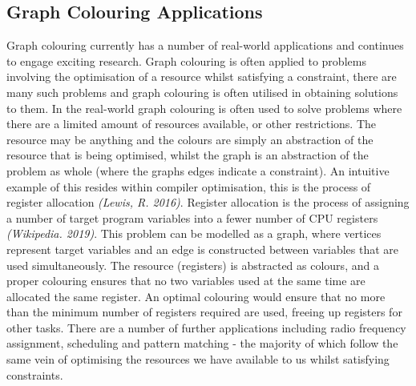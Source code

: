\documentclass[12pt,a4paper]{article}
\begin{document}
\subsection*{Graph Colouring Applications} 
\noindent
Graph colouring currently has a number of real-world applications and continues to engage exciting research. Graph colouring is often applied to problems involving the optimisation of a resource whilst satisfying a constraint, there are many such problems and graph colouring is often utilised in obtaining solutions to them. In the real-world graph colouring is often used to solve problems where there are a limited amount of resources available, or other restrictions. The resource may be anything and the colours are simply an abstraction of the resource that is being optimised, whilst the graph is an abstraction of the problem as whole (where the graphs edges indicate a constraint). An intuitive example of this resides within compiler optimisation, this is the process of register allocation \textit{(Lewis, R. 2016)}. Register allocation is the process of assigning a number of target program variables into a fewer number of CPU registers \textit{(Wikipedia. 2019)}. This problem can be modelled as a graph, where vertices represent target variables and an edge is constructed between variables that are used simultaneously. The resource (registers) is abstracted as colours, and a proper colouring ensures that no two variables used at the same time are allocated the same register. An optimal colouring would ensure that no more than the minimum number of registers required are used, freeing up registers for other tasks. There are a number of further applications including radio frequency assignment, scheduling and pattern matching - the majority of which follow the same vein of optimising the resources we have available to us whilst satisfying constraints.
\end{document}
